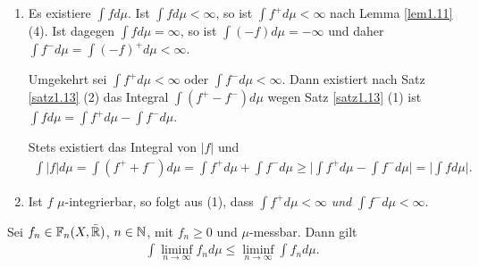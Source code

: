 \documentclass[a4paper,twoside,DIV15,BCOR12mm]{scrbook}
\begin{document}
\begin{beweis}
\begin{enumerate}
\item Es existiere $\int fd\mu$. Ist $\int fd\mu <\infty$, so ist $\int f^+ d\mu <\infty$ nach Lemma \ref{lem1.11} (4). Ist dagegen $\int fd\mu =\infty$, so ist $\int (-f)d\mu = -\infty$ und daher $\int f^- d\mu = \int (-f)^+d\mu <\infty$.

Umgekehrt sei $\int f^+d\mu <\infty$ oder $\int f^- d\mu <\infty$. Dann existiert nach Satz \ref{satz1.13} (2) das Integral $\int (f^+-f^-)d\mu$ wegen Satz \ref{satz1.13} (1) ist $\int fd\mu = \int f^+d\mu - \int f^-d\mu$.

Stets existiert das Integral von $|f|$ und 
\begin{align*}
\int |f|d\mu = \int (f^+ + f^-) d\mu = \int f^+ d\mu + \int f^- d\mu 
\ge \Big|\int f^+ d\mu - \int f^-d\mu \Big| = \Big|\int fd\mu \Big |.
\end{align*}
\item Ist $f$ $\mu$-integrierbar, so folgt aus (1), dass $\int f^+d \mu <\infty$ \emph{und} $\int f^-d \mu<\infty$.
\end{enumerate}
\end{beweis}

\begin{satz}
\label{satz1.15}
Sei $f_n \in \mathbb F_n(X,\bar{\mathbb{R}})$, $n\in\mathbb{N}$, mit $f_n\ge 0$ und $\mu$-messbar. Dann gilt
\begin{align*}
\int \liminf_{n\to\infty} f_n d\mu \le \liminf_{n\to\infty} \int f_n d\mu.
\end{align*}
\end{satz}
\end{document}
